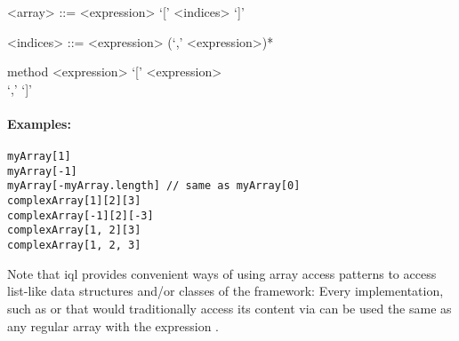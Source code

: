 \documentclass[11pt,a4paper]{report}
\begin{document}
\begin{gram}
	\label{gram:list-access}
	\begin{grammar}	
		<array> ::= <expression> `[' <indices> `]'
		
		<indices> ::= <expression> (`,' <expression>)*	
	\end{grammar}
	\diagsep
	
	\begin{rrdiag*}{method}
		<expression> `[' \srp <expression> \\ `,' \erp `]'
	\end{rrdiag*}
\end{gram}

\paragraph{Examples:}

\begin{Verbatim}[samepage=true]
myArray[1]
myArray[-1]
myArray[-myArray.length] // same as myArray[0]
complexArray[1][2][3]
complexArray[-1][2][-3]
complexArray[1, 2][3]
complexArray[1, 2, 3]
\end{Verbatim}

\noindent Note that \ac{iql} provides convenient ways of using array access patterns to access list-like data structures and/or classes of the framework:
Every  implementation, such as  or  that would traditionally access its content via  can be used the same as any regular array with the expression .
\end{document}
